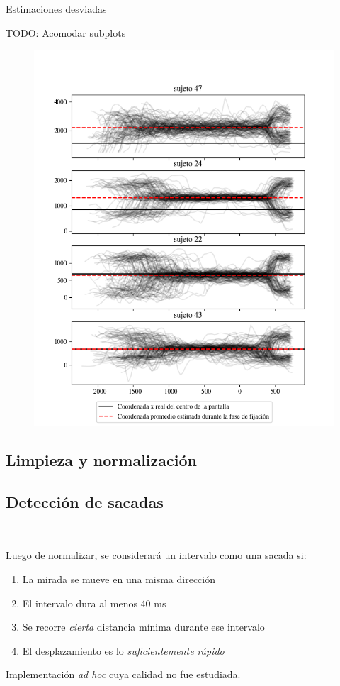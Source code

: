 \documentclass[aspectratio=169]{beamer}
\begin{document}
\begin{frame}{Estimaciones desviadas}

  TODO: Acomodar subplots
  \begin{figure}
    \includegraphics[width=0.8\linewidth]{img/skewed-estimations-examples.png}
  \end{figure}

\end{frame}

\subsection{Limpieza y normalización}

\subsection{Detección de sacadas}

\begin{frame}{~}

  Luego de normalizar, se considerará un intervalo como una sacada si:
  \begin{enumerate}
    \item La mirada se mueve en una misma dirección
    \item El intervalo dura al menos 40 ms
    \item Se recorre \textit{cierta} distancia mínima durante ese intervalo
    \item El desplazamiento es lo \textit{suficientemente rápido}
  \end{enumerate}
  Implementación \textit{ad hoc} cuya calidad no fue estudiada.

\end{frame}
\end{document}
